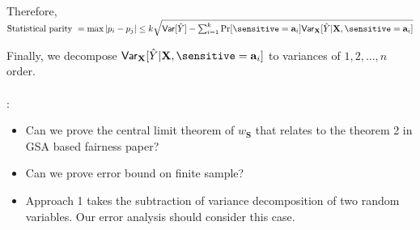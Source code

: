 Therefore, $ \text{Statistical parity } = \max|p_i - p_j| \le k \sqrt{\mathsf{Var}[\hat{Y}] - \sum_{i=1}^k \Pr[\sensitive=\mathbf{a}_i] \mathsf{Var}_{\mathbf{X}}[\hat{Y}|\mathbf{X}, \sensitive=\mathbf{a}_i]}$

Finally, we decompose $ \mathsf{Var}_{\mathbf{X}}[\hat{Y}|\mathbf{X}, \sensitive = \mathbf{a}_i] $ to variances of $1, 2, \dots, n $ order.


\paragraph{}:

\begin{itemize}
	\item  Can we prove the central limit theorem of $ w_{\mathbf{S}} $ that relates to the theorem 2 in GSA based fairness paper? 
	
	\item Can we prove error bound on finite sample?
	
	\item Approach 1 takes the subtraction of variance decomposition of two random variables. Our error analysis should consider this case. 
\end{itemize}



